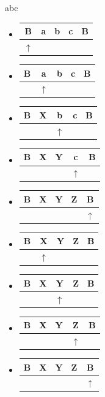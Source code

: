 \documentclass[12pt]{article}
\begin{document}
abc
\begin{itemize}
\item 
  \begin{tabular}{|c|c|c|c|c}
    \hline
    B&a&b&c&B\\
    \hline
    $\uparrow$&&&& 
  \end{tabular}
\item 
  \begin{tabular}{|c|c|c|c|c}
    \hline
    B&a&b&c&B\\
    \hline
    &$\uparrow$&&& 
  \end{tabular}
\item 
  \begin{tabular}{|c|c|c|c|c}
    \hline
    B&X&b&c&B\\
    \hline
    &&$\uparrow$&& 
  \end{tabular}
\item 
  \begin{tabular}{|c|c|c|c|c}
    \hline
    B&X&Y&c&B\\
    \hline
    &&&$\uparrow$& 
  \end{tabular}
  \item 
  \begin{tabular}{|c|c|c|c|c}
    \hline
    B&X&Y&Z&B\\
    \hline
    &&&&$\uparrow$
  \end{tabular}
      \item 
  \begin{tabular}{|c|c|c|c|c}
    \hline
    B&X&Y&Z&B\\
    \hline
   & $\uparrow$&&& 
  \end{tabular}  
\item
  \begin{tabular}{|c|c|c|c|c}
    \hline
    B&X&Y&Z&B\\
    \hline
&& $\uparrow$&& 
  \end{tabular}  
    \item 
  \begin{tabular}{|c|c|c|c|c}
    \hline
    B&X&Y&Z&B\\
    \hline
    &&& $\uparrow$& 
  \end{tabular}  
    \item 
  \begin{tabular}{|c|c|c|c|c}
    \hline
    B&X&Y&Z&B\\
    \hline
   &&&& $\uparrow$ 
  \end{tabular}  
\end{itemize}
\end{document}
